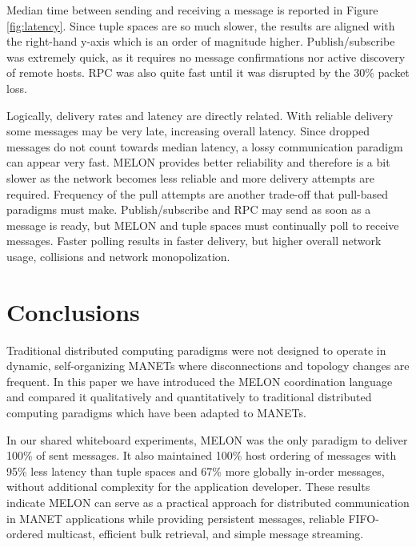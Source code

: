 \documentclass{llncs}
\begin{document}
Median time between sending and receiving a message is reported in Figure \ref{fig:latency}. Since tuple spaces are so much slower, the results are aligned with the right-hand y-axis which is an order of magnitude higher. Publish/subscribe was extremely quick, as it requires no message confirmations nor active discovery of remote hosts. RPC was also quite fast until it was disrupted by the 30\% packet loss.

Logically, delivery rates and latency are directly related. With reliable delivery some messages may be very late, increasing overall latency. Since dropped messages do not count towards median latency, a lossy communication paradigm can appear very fast. MELON provides better reliability and therefore is a bit slower as the network becomes less reliable and more delivery attempts are required. Frequency of the pull attempts are another trade-off that pull-based paradigms must make. Publish/subscribe and RPC may send as soon as a message is ready, but MELON and tuple spaces must continually poll to receive messages. Faster polling results in faster delivery, but higher overall network usage, collisions and network monopolization.


\section{Conclusions}\label{sec:conclusions}

Traditional distributed computing paradigms were not designed to operate in dynamic, self-organizing MANETs where disconnections and topology changes are frequent. In this paper we have introduced the MELON coordination language and compared it qualitatively and quantitatively to traditional distributed computing paradigms which have been adapted to MANETs.

In our shared whiteboard experiments, MELON was the only paradigm to deliver 100\% of sent messages. It also maintained 100\% host ordering of messages with 95\% less latency than tuple spaces and 67\% more globally in-order messages, without additional complexity for the application developer. These results indicate MELON can serve as a practical approach for distributed communication in MANET applications while providing persistent messages, reliable FIFO-ordered multicast, efficient bulk retrieval, and simple message streaming.



\end{document}
